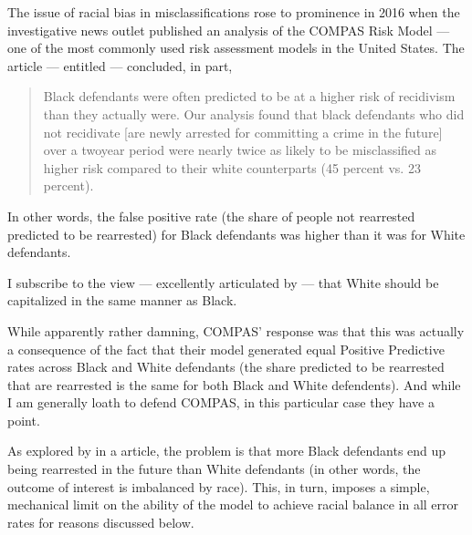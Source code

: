 \documentclass[letterpaper,10pt,english]{jupyterBook}
\begin{document}
\sphinxAtStartPar
The issue of racial bias in misclassifications rose to prominence in 2016 when the investigative news outlet  published an analysis of the COMPAS Risk Model — one of the most commonly used risk assessment models in the United States. The article — entitled  — concluded, in part, 
\begin{quote}

\sphinxAtStartPar
Black defendants were often predicted to be at a higher risk of recidivism than they actually were. Our analysis found that black defendants who did not recidivate {[}are newly arrested for committing a crime in the future{]} over a two\sphinxhyphen{}year period were nearly twice as likely to be misclassified as higher risk compared to their white counterparts (45 percent vs. 23 percent).
\end{quote}

\sphinxAtStartPar
In other words, the false positive rate (the share of people not re\sphinxhyphen{}arrested predicted to be re\sphinxhyphen{}arrested) for Black defendants was higher than it was for White defendants.%
\begin{footnote}[1]\sphinxAtStartFootnote
I subscribe to the view — excellently articulated by  — that White should be capitalized in the same manner as Black.
%
\end{footnote}

\sphinxAtStartPar
While apparently rather damning, COMPAS’ response was that this was actually a consequence of the fact that their model generated equal Positive Predictive rates across Black and White defendants (the share predicted to be re\sphinxhyphen{}arrested that are re\sphinxhyphen{}arrested is the same for both Black and White defendents). And while I am generally loath to defend COMPAS, in this particular case they have a point.

\sphinxAtStartPar
As explored by  in a  article, the problem is that more Black defendants end up being re\sphinxhyphen{}arrested in the future than White defendants (in other words, the outcome of interest is imbalanced by race). This, in turn, imposes a simple, mechanical limit on the ability of the model to achieve racial balance in all error rates for reasons discussed below.
\end{document}

